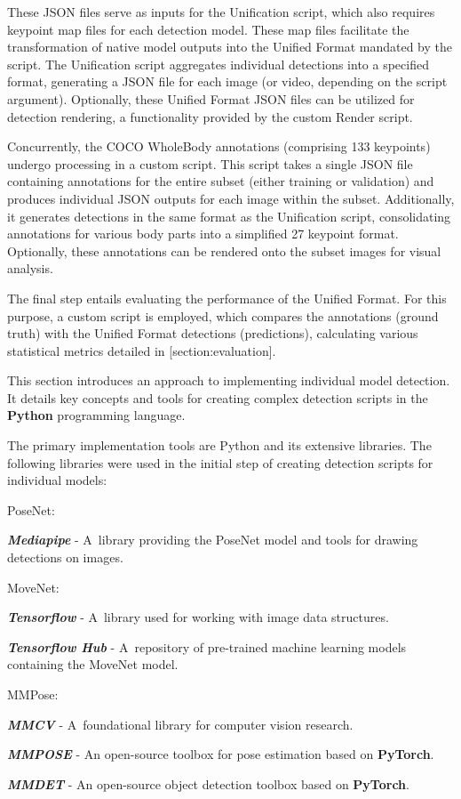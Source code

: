 These JSON files serve as inputs for the Unification script, which also requires keypoint map files for each detection model. These map files facilitate the transformation of native model outputs into the Unified Format mandated by the script. The Unification script aggregates individual detections into a specified format, generating a JSON file for each image (or video, depending on the script argument). Optionally, these Unified Format JSON files can be utilized for detection rendering, a functionality provided by the custom Render script.

Concurrently, the COCO WholeBody annotations (comprising 133 keypoints) undergo processing in a custom script. This script takes a single JSON file containing annotations for the entire subset (either training or validation) and produces individual JSON outputs for each image within the subset. Additionally, it generates detections in the same format as the Unification script, consolidating annotations for various body parts into a simplified 27 keypoint format. Optionally, these annotations can be rendered onto the subset images for visual analysis.

The final step entails evaluating the performance of the Unified Format. For this purpose, a custom script is employed, which compares the annotations (ground truth) with the Unified Format detections (predictions), calculating various statistical metrics detailed in [section:evaluation].

This section introduces an approach to implementing individual model detection. It details key concepts and tools for creating complex detection scripts in the {\bf Python} programming language.

The primary implementation tools are Python and its extensive libraries. The following libraries were used in the initial step of creating detection scripts for individual models:

\startitemize[n]
 \item PoseNet:
 \startitemize[1]
 \item {\bf {\em Mediapipe}} - A~library providing the PoseNet model and tools for drawing detections on images.
 \stopitemize
 \item MoveNet:
 \startitemize[1]
 \item {\bf {\em Tensorflow}} - A~library used for working with image data structures.
 \item {\bf {\em Tensorflow Hub}} - A~repository of pre-trained machine learning models containing the MoveNet model.
 \stopitemize
 \item MMPose:
 \startitemize[1]
 \item {\bf {\em MMCV}} - A~foundational library for computer vision research.
 \item {\bf {\em MMPOSE}} - An open-source toolbox for pose estimation based on {\bf PyTorch}.
 \item {\bf {\em MMDET}} - An open-source object detection toolbox based on {\bf PyTorch}.
 \stopitemize
\stopitemize

